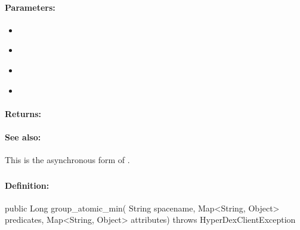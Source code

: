\paragraph{Parameters:}
\begin{itemize}[noitemsep]
\item {}\\

\item {}\\

\item {}\\

\item {}\\

\end{itemize}

\paragraph{Returns:}


\paragraph{See also:}  This is the asynchronous form of .

\pagebreak
\subsubsection{}
\label{api:java:group_atomic_min}


\paragraph{Definition:}
\begin{javacode}
public Long group_atomic_min(
        String spacename,
        Map<String, Object> predicates,
        Map<String, Object> attributes) throws HyperDexClientException
\end{javacode}

